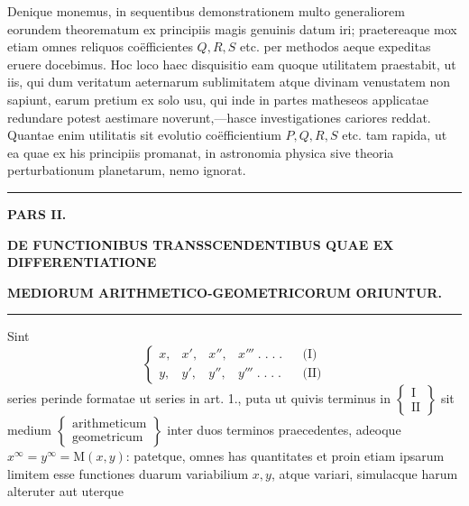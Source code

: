 Denique monemus, in sequentibus demonstrationem multo generaliorem eorundem
theorematum ex principiis magis genuinis datum iri; praetereaque mox etiam omnes
reliquos coëfficientes $Q,R,S$ etc. per methodos aeque expeditas eruere docebimus.
Hoc loco haec disquisitio eam quoque utilitatem praestabit, ut iis, qui dum
veritatum aeternarum sublimitatem atque divinam venustatem non sapiunt, earum
pretium ex solo usu, qui inde in partes matheseos applicatae redundare potest
aestimare noverunt,---hasce investigationes cariores reddat. Quantae enim utilitatis
sit evolutio coëfficientium $P,Q,R,S$ etc. tam rapida, ut ea quae ex his principiis
promanat, in astronomia physica sive theoria perturbationum planetarum, nemo ignorat.


\par\begin{center}\rule{.15\linewidth}{.4pt}\end{center}
\clearpage{}
\begin{center}
\textbf{PARS II.}\par
\textbf{DE FUNCTIONIBUS TRANSSCENDENTIBUS QUAE EX DIFFERENTIATIONE}\par
\textbf{MEDIORUM ARITHMETICO-GEOMETRICORUM ORIUNTUR.}
\end{center}
\par\begin{center}\rule{.15\linewidth}{.4pt}\end{center}
Sint
\[
\left\{\begin{array}{llllll}
x,&x',&x'',&x'''\; .\; .\; .\; .&&\text{(I)}\\[6pt]
y,&y',&y'',&y'''\; .\; .\; .\; .&&\text{(II)}
\end{array}\right.
\]
series perinde formatae ut series in art. 1., puta ut quivis terminus in
$\left\{\begin{array}{c}\mathrm{I}\\\mathrm{II}\end{array}\right\}$ sit medium
$\left\{\begin{array}{c}\text{arithmeticum}\\\text{geometricum}\end{array}\right\}$
inter duos terminos praecedentes, adeoque $x^{\infty}=y^{\infty}=\mathrm{M}(x,y)$:
patetque, omnes has quantitates et proin etiam ipsarum limitem esse functiones
duarum variabilium $x,y$, atque variari, simulacque harum alteruter aut uterque
